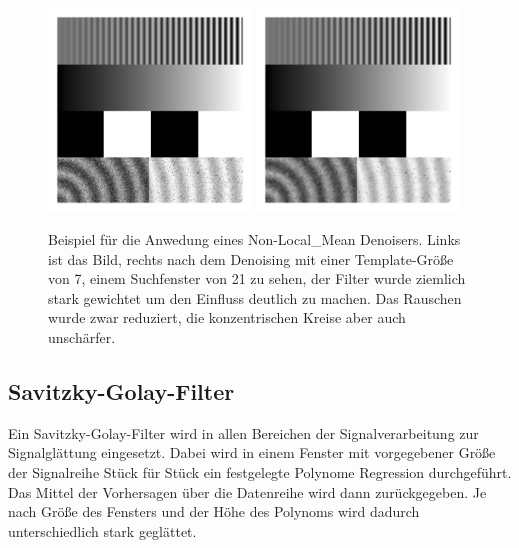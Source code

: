 \documentclass[
  12pt,
]{book}
\begin{document}
\begin{figure}

{\centering \includegraphics[width=0.48\textwidth]{../imgs/geometric} \includegraphics[width=0.48\textwidth]{../imgs/nlMean_30_7_21} 

}

\caption[Beispiel für die Anwedung eines Non-Local\_Mean Denoisers.]{Beispiel für die Anwedung eines Non-Local\_Mean Denoisers. Links ist das Bild, rechts nach dem Denoising mit einer Template-Größe von 7, einem Suchfenster von 21 zu sehen, der Filter wurde ziemlich stark gewichtet um den Einfluss deutlich zu machen. Das Rauschen wurde zwar reduziert, die konzentrischen Kreise aber auch unschärfer.}\label{fig:nlMeans}
\end{figure}

\hypertarget{savitzky-golay-filter}{%
\subsection{Savitzky-Golay-Filter}\label{savitzky-golay-filter}}

Ein Savitzky-Golay-Filter wird in allen Bereichen der Signalverarbeitung zur Signalglättung eingesetzt. Dabei wird in einem Fenster mit vorgegebener Größe der Signalreihe Stück für Stück ein festgelegte Polynome Regression durchgeführt. Das Mittel der Vorhersagen über die Datenreihe wird dann zurückgegeben. Je nach Größe des Fensters und der Höhe des Polynoms wird dadurch unterschiedlich stark geglättet.
\end{document}
